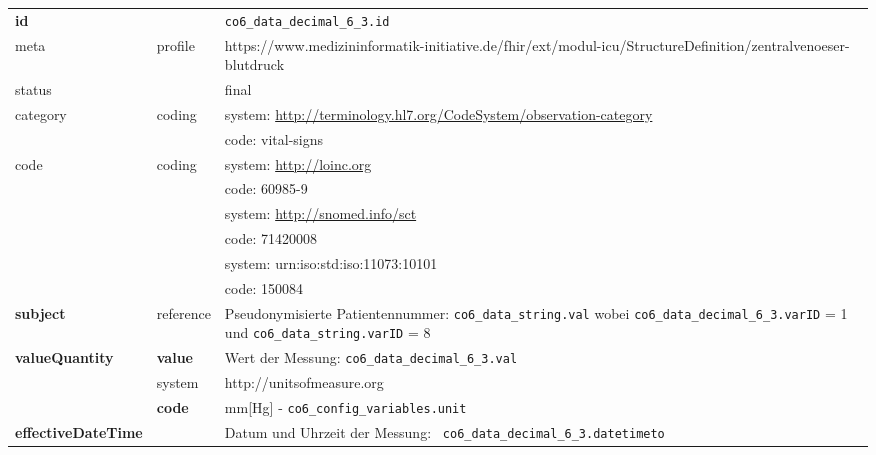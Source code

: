 \begin{longtable}{|l|l|p{7.5cm}|}
        \hline
        \rowcolor{lightgray} \multicolumn{3}{|l|}{Data Mapping (inhaltlich)} \\ \hline
        \textbf{id} &  & \texttt{co6\_data\_decimal\_6\_3.id} \\ \hline
	meta & profile & https://www.medizininformatik-initiative.de/fhir/ext/modul-icu/StructureDefinition/zentralvenoeser-blutdruck \\ \hline 
	status &  & final   \\ \hline 
	category & coding & system: \url{http://terminology.hl7.org/CodeSystem/observation-category} \\
\cline{3-3}
	& & code: vital-signs \\ \hline
	code & coding & system: \url{http://loinc.org} \\ 
	\cline{3-3} 
	&  & code: 60985-9 \\ 
	\cline{3-3} 
	&  & system: \url{http://snomed.info/sct} \\ 
	\cline{3-3}
	&  & code: 71420008 \\ 
	\cline{3-3} 
	&  & system: urn:iso:std:iso:11073:10101 \\ 
	\cline{3-3}
	&  & code: 150084 \\ \hline
	 \textbf{subject} & reference & Pseudonymisierte Patientennummer: \texttt{co6\_data\_string.val} wobei \texttt{co6\_data\_decimal\_6\_3.varID} = 1 und \texttt{co6\_data\_string.varID} = 8 \\ \hline
	 \textbf{valueQuantity}  & \textbf{value} & Wert der Messung: \texttt{co6\_data\_decimal\_6\_3.val} \\
        \cline{2-3}
         & system & http://unitsofmeasure.org \\
         \cline{2-3}
         & \textbf{code} & mm[Hg] - \texttt{co6\_config\_variables.unit} \\ \hline
     \textbf{effectiveDateTime}  & & Datum und Uhrzeit der Messung: \texttt{
co6\_data\_decimal\_6\_3.datetimeto} \\ \hline
\end{longtable}
